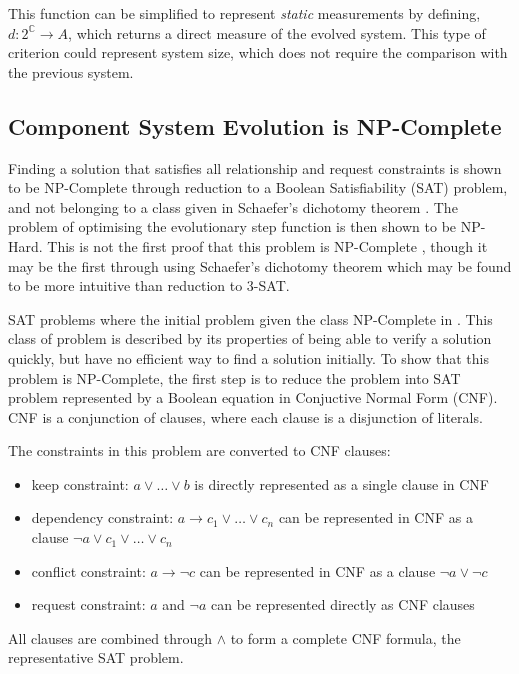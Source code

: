 This function can be simplified to represent \textit{static} measurements by defining, $d: 2^\mathbb{C} \rightarrow A$, which returns a direct measure of the evolved system.
This type of criterion could represent system size, which does not require the comparison with the previous system.

\subsection{Component System Evolution is NP-Complete}
Finding a solution that satisfies all relationship and request constraints is shown to be NP-Complete through reduction to a Boolean Satisfiability (SAT) problem,
and not belonging to a class given in Schaefer's dichotomy theorem \cite{Schaefer1978}.
The problem of optimising the evolutionary step function is then shown to be NP-Hard.
This is not the first proof that this problem is NP-Complete \cite{edos2005report}, 
though it may be the first through using Schaefer's dichotomy theorem which may be found to be more intuitive than reduction to 3-SAT.

SAT problems where the initial problem given the class NP-Complete in \cite{cook1971}.
This class of problem is described by its properties of being able to verify a solution quickly, but have no efficient way to find a solution initially.
To show that this problem is NP-Complete, the first step is to reduce the problem into SAT problem represented by a Boolean equation in Conjuctive Normal Form (CNF).
CNF is a conjunction of clauses, where each clause is a disjunction of literals.

The constraints in this problem are converted to CNF clauses:
\begin{itemize}
  \item keep constraint: $a \vee \ldots \vee b$ is directly represented as a single clause in CNF
  \item dependency constraint: $a \rightarrow c_1 \vee \ldots \vee c_n$ can be represented in CNF as a clause $\neg a \vee c_1 \vee \ldots \vee c_n$
  \item conflict constraint: $a \rightarrow \neg c$ can be represented in CNF as a clause $\neg a \vee \neg c$
  \item request constraint: $a$ and $\neg a$ can be represented directly as CNF clauses
\end{itemize}
All clauses are combined through $\wedge$ to form a complete CNF formula, the representative SAT problem.

